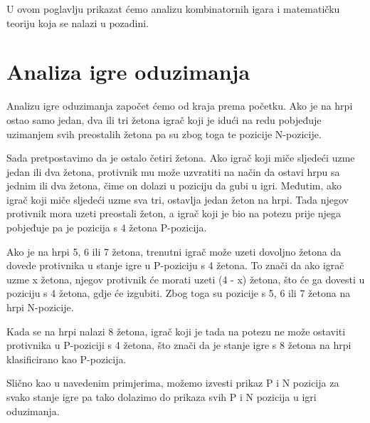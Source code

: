 U ovom poglavlju prikazat ćemo analizu kombinatornih igara i matematičku teoriju koja se nalazi u pozadini. 


\section{Analiza igre oduzimanja}

Analizu igre oduzimanja započet ćemo od kraja prema početku. Ako je na hrpi ostao samo jedan, dva ili tri žetona igrač koji je idući na redu pobjeđuje uzimanjem svih preostalih žetona pa su zbog toga te pozicije N-pozicije. 

Sada pretpostavimo da je ostalo četiri žetona. Ako igrač koji miče sljedeći uzme jedan ili dva žetona, protivnik mu može uzvratiti na način da ostavi hrpu sa jednim ili dva žetona, čime on dolazi u poziciju da gubi u igri. Međutim, ako igrač koji miče sljedeći uzme sva tri, ostavlja jedan žeton na hrpi. Tada njegov protivnik mora uzeti preostali žeton, a igrač koji je bio na potezu prije njega pobjeđuje pa je pozicija s 4 žetona P-pozicija.

Ako je na hrpi 5, 6 ili 7 žetona, trenutni igrač može uzeti dovoljno žetona da dovede protivnika u stanje igre u P-poziciju s 4 žetona. To znači da ako igrač uzme x žetona, njegov protivnik će morati uzeti (4 - x) žetona, što će ga dovesti u poziciju s 4 žetona, gdje će izgubiti. Zbog toga su pozicije s 5, 6 ili 7 žetona na hrpi N-pozicije.

Kada se na hrpi nalazi 8 žetona, igrač koji je tada na potezu ne može ostaviti protivnika u P-poziciji s 4 žetona, što znači da je stanje igre s 8 žetona na hrpi klasificirano kao P-pozicija.

Slično kao u navedenim primjerima, možemo izvesti prikaz P i N pozicija za svako stanje igre pa tako dolazimo do prikaza svih P i N pozicija u igri oduzimanja.

